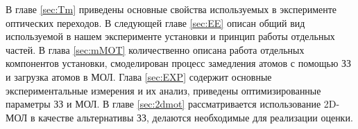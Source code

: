 В главе \ref{sec:Tm} приведены основные свойства используемых в эксперименте оптических переходов.  В следующей главе \ref{sec:EE} описан общий вид используемой в нашем эксперименте установки и принцип работы отдельных частей. В глава \ref{sec:mMOT}  количественно описана работа отдельных компонентов установки, смоделирован процесс замедления атомов с помощью ЗЗ и загрузка атомов в МОЛ. Глава \ref{sec:EXP} содержит основные экспериментальные измерения и их анализ, приведены оптимизированные параметры ЗЗ и МОЛ. В главе \ref{sec:2dmot} рассматривается использование 2D-МОЛ в качестве альтернативы ЗЗ, делаются необходимые для реализации оценки.